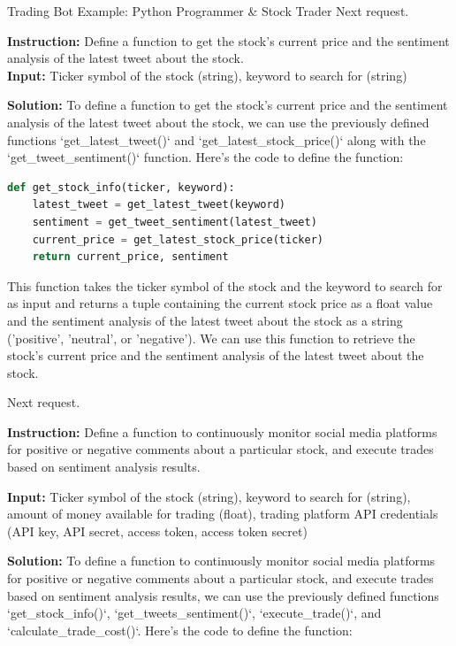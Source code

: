 \begin{AIBoxBreak}{Trading Bot Example: Python Programmer \& Stock Trader}
	Next request.\\

	\usermsg

	\textbf{Instruction:} Define a function to get the stock's current price and the sentiment analysis of the latest tweet about the stock.\\
	\textbf{Input:} Ticker symbol of the stock (string), keyword to search for (string)\\

	\assistantmsg

	\textbf{Solution:} To define a function to get the stock's current price and the sentiment analysis of the latest tweet about the stock, we can use the previously defined functions
	`get\_latest\_tweet()` and `get\_latest\_stock\_price()` along with the `get\_tweet\_sentiment()` function. Here's the code to define the function:

	\begin{lstlisting}[language=Python]
def get_stock_info(ticker, keyword):
    latest_tweet = get_latest_tweet(keyword)
    sentiment = get_tweet_sentiment(latest_tweet)
    current_price = get_latest_stock_price(ticker)
    return current_price, sentiment
\end{lstlisting}

	This function takes the ticker symbol of the stock and the keyword to search for as input and returns a tuple containing the current stock price as a float value and the sentiment analysis of the latest tweet about the stock as a string ('positive', 'neutral', or 'negative'). We can use this function to retrieve the stock's current price and the sentiment analysis of the latest tweet about the stock.

	Next request.\\

	\usermsg

	\textbf{Instruction:} Define a function to continuously monitor social media platforms for positive or negative comments about a particular stock, and execute trades based on sentiment analysis results.

	\textbf{Input:} Ticker symbol of the stock (string), keyword to search for (string), amount of money available for trading (float), trading platform API credentials (API key, API secret, access token, access token secret)\\

	\assistantmsg

	\textbf{Solution:} To define a function to continuously monitor social media platforms for positive or negative comments about a particular stock, and execute trades based on sentiment analysis results, we can use the previously defined functions `get\_stock\_info()`, `get\_tweets\_sentiment()`, `execute\_trade()`, and `calculate\_trade\_cost()`. Here's the code to define the function:


\end{AIBoxBreak}
